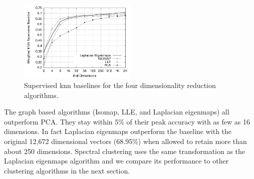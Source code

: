 \begin{figure}[h] \centering
\includegraphics[width=0.5\textwidth]{baseline_graph_mono.png}
\caption{Supervised knn baselines for the four dimensionality
  reduction algorithms.}
\label{fig:dimreduce}
\end{figure}

% 

The graph based algorithms (Isomap, LLE, and Laplacian eigenmaps) all
outperform PCA.  They stay within 5\% of their peak accuracy with as
few as 16 dimensions.  In fact Laplacian eigenmaps outperform the
baseline with the original 12,672 dimensional vectors (68.95\%) when
allowed to retain more than about 250 dimensions.  Spectral clustering
uses the same transformation as the Laplacian eigenmaps algorithm and
we compare its performance to other clustering algorithms in the next
section.

